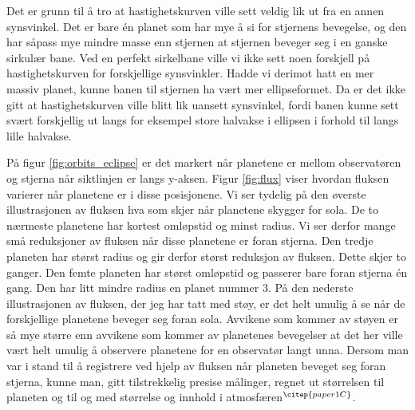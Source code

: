 \documentclass[reprint, english,notitlepage]{revtex4-1}  %
\begin{document}
Det er grunn til å tro at hastighetskurven ville sett veldig lik ut fra en annen synsvinkel. Det er bare én planet som har mye å si for stjernens bevegelse, og den har såpass mye mindre masse enn stjernen at stjernen beveger seg i en ganske sirkulær bane. Ved en perfekt sirkelbane ville vi ikke sett noen forskjell på hastighetskurven for forskjellige synsvinkler. Hadde vi derimot hatt en mer massiv planet, kunne banen til stjernen ha vært mer ellipseformet. Da er det ikke gitt at hastighetskurven ville blitt lik uansett synsvinkel, fordi banen kunne sett svært forskjellig ut langs for eksempel store halvakse i ellipsen i forhold til langs lille halvakse.

På figur \ref{fig:orbits_eclipse} er det markert når planetene er mellom observatøren og stjerna når siktlinjen er langs y-aksen. Figur \ref{fig:flux} viser hvordan fluksen varierer når planetene er i disse posisjonene. Vi ser tydelig på den øverste illustrasjonen av fluksen hva som skjer når planetene skygger for sola. De to nærmeste planetene har kortest omløpstid og minst radius. Vi ser derfor mange små reduksjoner av fluksen når disse planetene er foran stjerna. Den tredje planeten har størst radius og gir derfor størst reduksjon av fluksen. Dette skjer to ganger. Den femte planeten har størst omløpstid og passerer bare foran stjerna én gang. Den har litt mindre radius en planet nummer 3. På den nederste illustrasjonen av fluksen, der jeg har tatt med støy, er det helt umulig å se når de forskjellige planetene beveger seg foran sola. Avvikene som kommer av støyen er så mye større enn avvikene som kommer av planetenes bevegelser at det her ville vært helt umulig å observere planetene for en observatør langt unna. Dersom man var i stand til å registrere ved hjelp av fluksen når planeten beveget seg foran stjerna, kunne man, gitt tilstrekkelig presise målinger, regnet ut størrelsen til planeten og til og med størrelse og innhold i atmosfæren$^{\citep{paper1C}}$.
\end{document}
